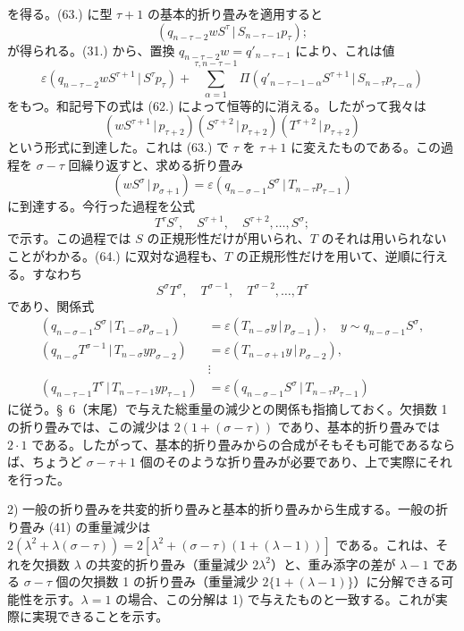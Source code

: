 \documentclass[11pt]{article}
\newcommand{\pair}[2]{(#1\,|\,#2)}
\newcommand{\eps}{\varepsilon}
\begin{document}
を得る。(63.) に型 $\tau+1$ の基本的折り畳みを適用すると
\[
 \pair{q_{n-\tau-2}wS^\tau}{S_{n-\tau-1}p_\tau};
\]
が得られる。(31.) から、置換 $q_{n-\tau-2}w=q'_{n-\tau-1}$ により、これは値
\[
 \eps\pair{q_{n-\tau-2}wS^{\tau+1}}{S^\tau p_\tau}
 +\sum_{\alpha=1}^{\tau,n-\tau-1}\Pi\pair{q'_{n-\tau-1-\alpha}S^{\tau+1}}{S_{n-\tau}p_{\tau-\alpha}}
\]
をもつ。和記号下の式は (62.) によって恒等的に消える。したがって我々は
\[
 \pair{wS^{\tau+1}}{p_{\tau+2}}\pair{S^{\tau+2}}{p_{\tau+2}}\pair{T^{\tau+2}}{p_{\tau+2}}
\]
という形式に到達した。これは (63.) で $\tau$ を $\tau+1$ に変えたものである。この過程を $\sigma-\tau$ 回繰り返すと、求める折り畳み
\[
 \pair{wS^\sigma}{p_{\sigma+1}}=\eps\pair{q_{n-\sigma-1}S^\sigma}{T_{n-\tau}p_{\tau-1}}
\]
に到達する。今行った過程を公式
\begin{equation}
 T^\tau S^\tau,
\quad S^{\tau+1},\quad S^{\tau+2},\ldots,S^\sigma;
\tag{64}
\end{equation}
で示す。この過程では $S$ の正規形性だけが用いられ、$T$ のそれは用いられないことがわかる。(64.) に双対な過程も、$T$ の正規形性だけを用いて、逆順に行える。すなわち
\begin{equation}
 S^\sigma T^\sigma,
\quad T^{\sigma-1},\quad T^{\sigma-2},\ldots,T^\tau
\tag{65}
\end{equation}
であり、関係式
\begin{align*}
\pair{q_{n-\sigma-1}S^\sigma}{T_{1-\sigma}p_{\sigma-1}}&=\eps\pair{T_{n-\sigma}y}{p_{\sigma-1}},\quad y\sim q_{n-\sigma-1}S^\sigma,\\
\pair{q_{n-\sigma}T^{\sigma-1}}{T_{n-\sigma}yp_{\sigma-2}}&=\eps\pair{T_{n-\sigma+1}y}{p_{\sigma-2}},\\
&\vdots\\
\pair{q_{n-\tau-1}T^\tau}{T_{n-\tau-1}yp_{\tau-1}}&=\eps\pair{q_{n-\sigma-1}S^\sigma}{T_{n-\tau}p_{\tau-1}}
\end{align*}
に従う。\S\ 6（末尾）で与えた総重量の減少との関係も指摘しておく。欠損数 1 の折り畳みでは、この減少は $2(1+(\sigma-\tau))$ であり、基本的折り畳みでは $2\cdot1$ である。したがって、基本的折り畳みからの合成がそもそも可能であるならば、ちょうど $\sigma-\tau+1$ 個のそのような折り畳みが必要であり、上で実際にそれを行った。

2) 一般の折り畳みを共変的折り畳みと基本的折り畳みから生成する。一般の折り畳み (41) の重量減少は $2(\lambda^2+\lambda(\sigma-\tau))=2[\lambda^2+(\sigma-\tau)(1+(\lambda-1))]$ である。これは、それを欠損数 $\lambda$ の共変的折り畳み（重量減少 $2\lambda^2$）と、重み添字の差が $\lambda-1$ である $\sigma-\tau$ 個の欠損数 1 の折り畳み（重量減少 $2\{1+(\lambda-1)\}$）に分解できる可能性を示す。$\lambda=1$ の場合、この分解は 1) で与えたものと一致する。これが実際に実現できることを示す。
\end{document}
